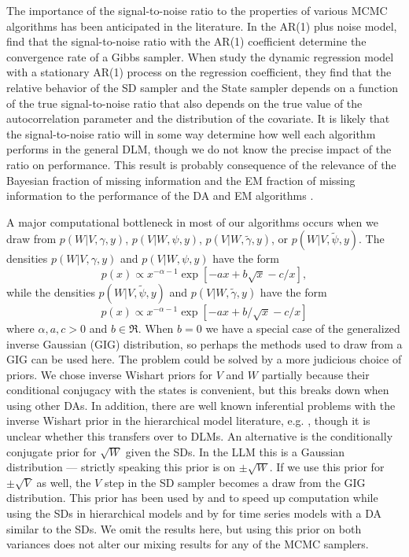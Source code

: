 \documentclass[12pt]{article}
\begin{document}
The importance of the signal-to-noise ratio to the properties of various MCMC algorithms has been anticipated in the literature. In the AR(1) plus noise model, \citet{pitt1999analytic} find that the signal-to-noise ratio with the AR(1) coefficient determine the convergence rate of a Gibbs sampler. When \citet{fruhwirth2004efficient} study the dynamic regression model with a stationary AR(1) process on the regression coefficient, they find that the relative behavior of the SD sampler and the State sampler depends on a function of the true signal-to-noise ratio that also depends on the true value of the autocorrelation parameter and the distribution of the covariate. It is likely that the signal-to-noise ratio will in some way determine how well each algorithm performs in the general DLM, though we do not know the precise impact of the ratio on performance. This result is probably consequence of the relevance of the Bayesian fraction of missing information and the EM fraction of missing information to the performance of the DA and EM algorithms \citep{van2001art}.

A major computational bottleneck in most of our algorithms occurs when we draw from $p(W|V,\gamma,y)$, $p(V|W,\psi,y)$, $p(V|W,\tilde{\gamma},y)$, or $p(W|V,\tilde{\psi},y)$. The densities $p(W|V,\gamma,y)$ and $p(V|W,\psi,y)$ have the form
\[
p(x)\propto x^{-\alpha-1}\exp\left[-ax + b\sqrt{x} - c/x\right],
\]
while the densities $p(W|V,\tilde{\psi},y)$ and $p(V|W,\tilde{\gamma},y)$ have the form
\[
p(x)\propto x^{-\alpha-1}\exp\left[ -ax + b/\sqrt{x} -c/x\right]
\]
where $\alpha,a,c>0$ and $b\in\Re$. When $b=0$ we have a special case of the generalized inverse Gaussian (GIG) distribution, so perhaps the methods used to draw from a GIG can be used here. The problem could be solved by a more judicious choice of priors. We chose inverse Wishart priors for $V$ and $W$ partially because their conditional conjugacy with the states is convenient, but this breaks down when using other DAs. In addition, there are well known inferential problems with the inverse Wishart prior in the hierarchical model literature, e.g. \citet{gelman2006prior}%
, though it is unclear whether this transfers over to DLMs. An alternative is the conditionally conjugate prior for $\sqrt{W}$ given the SDs. In the LLM this is a Gaussian distribution --- strictly speaking this prior is on $\pm \sqrt{W}$. If we use this prior for $\pm\sqrt{V}$ as well, the $V$ step in the SD sampler becomes a draw from the GIG distribution. This prior has been used by \citet{fruhwirth2011bayesian} and \citet{fruhwirth2008bayesian} to speed up computation while using the SDs in hierarchical models and by \citet{fruhwirth2010stochastic} for time series models with a DA similar to the SDs. We omit the results here, but using this prior on both variances does not alter our mixing results for any of the MCMC samplers.
\end{document}
